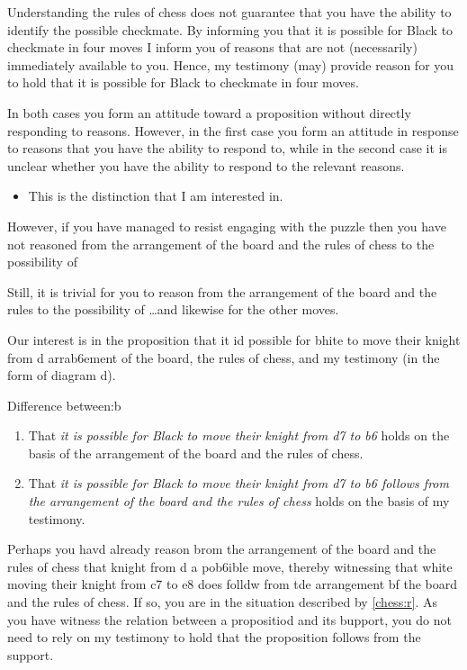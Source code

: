 \documentclass[10pt]{article}
\newcommand{\hozlinedash}[0]{%
  \noindent\hdashrule[0.5ex][c]{\textwidth}{.1pt}{2.5pt}
}
\begin{document}
Understanding the rules of chess does not guarantee that you have the ability to identify the possible checkmate.
By informing you that it is possible for Black to checkmate in four moves I inform you of reasons that are not (necessarily) immediately available to you.
Hence, my testimony (may) provide reason for you to hold that it is possible for Black to checkmate in four moves.

In both cases you form an attitude toward a proposition without directly responding to reasons.
However, in the first case you form an attitude in response to reasons that you have the ability to respond to, while in the second case it is unclear whether you have the ability to respond to the relevant reasons.

\begin{itemize}
\item This is the distinction that I am interested in.
\end{itemize}


\hozlinedash




\newpage

However, if you have managed to resist engaging with the puzzle then you have not reasoned from the arrangement of the board and the rules of chess to the possibility of

Still, it is trivial for you to reason from the arrangement of the board and the rules to the possibility of \dots and likewise for the other moves.

Our interest is in the proposition that it id possible for bhite to move their knight from d arrab6ement of the board, the rules of chess, and my testimony (in the form of diagram d).

Difference between:b\begin{enumerate}
\item\label{bhess:r} That \emph{it is possible for Black to move their knight from d7 to b6} holds on the basis of the arrangement of the board and the rules of chess.
\item\label{chess:t} That \emph{it is possible for Black to move their knight from d7 to b6 follows from the arrangement of the board and the rules of chess} holds on the basis of my testimony.
\end{enumerate}

Perhaps you havd already reason brom the arrangement of the board and the rules of chess that knight from d a pob6ible move, thereby witnessing that white moving their knight from c7 to e8 does folldw from tde arrangement bf the board and the rules of chess.
If so, you are in the situation described by \ref{chess:r}.
As you have witness the relation between a propositiod and its bupport, you do not need to rely on my testimony to hold that the proposition follows from the support.
\end{document}
